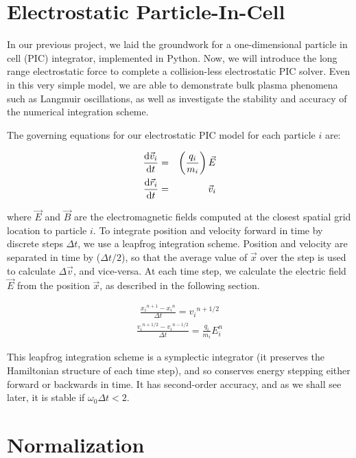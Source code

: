 \documentclass[%
 reprint,
 amsmath,amssymb,
 aps,
]{revtex4-2}
\begin{document}


\section{Electrostatic Particle-In-Cell}

In our previous project, we laid the groundwork for a one-dimensional particle in cell (PIC) integrator, implemented in Python. Now, we will introduce the long range electrostatic force to complete a collision-less electrostatic PIC solver. Even in this very simple model, we are able to demonstrate bulk plasma phenomena such as Langmuir oscillations, as well as investigate the stability and accuracy of the numerical integration scheme.

The governing equations for our electrostatic PIC model for each particle $i$ are:

\begin{eqnarray}
\dv{\vec v_i}{t} & =  & \left( \frac{q_i}{m_i} \right) \vec E\\
\dv{\vec r_i}{t} & = & \vec v_i
\end{eqnarray}

where $\vec E$ and $\vec B$ are the electromagnetic fields computed at the closest spatial grid location to particle $i$. To integrate position and velocity forward in time by discrete steps $\Delta t$, we use a leapfrog integration scheme. Position and velocity are separated in time by ($\Delta t/2$), so that the average value of $\vec x$ over the step is used to calculate $\Delta \vec v$, and vice-versa. At each time step, we calculate the electric field $\vec E$ from the position $\vec x$, as described in the following section.

\begin{eqnarray}
\frac{{x_i}^{n+1} - {x_i}^n}{\Delta t} = {v_i} ^{n + 1/2} \label{push}
\end{eqnarray}
\begin{eqnarray}
\frac{{v_i} ^{n+1/2} - {v_i}^{n - 1/2}}{\Delta t} = \frac{q_i}{m_i} E_i ^n \label{accel}
\end{eqnarray}

This leapfrog integration scheme is a symplectic integrator (it preserves the Hamiltonian structure of each time step), and so conserves energy stepping either forward or backwards in time. It has second-order accuracy, and as we shall see later, it is stable if $\omega_0 \Delta t < 2$.

\section{Normalization}
\end{document}

